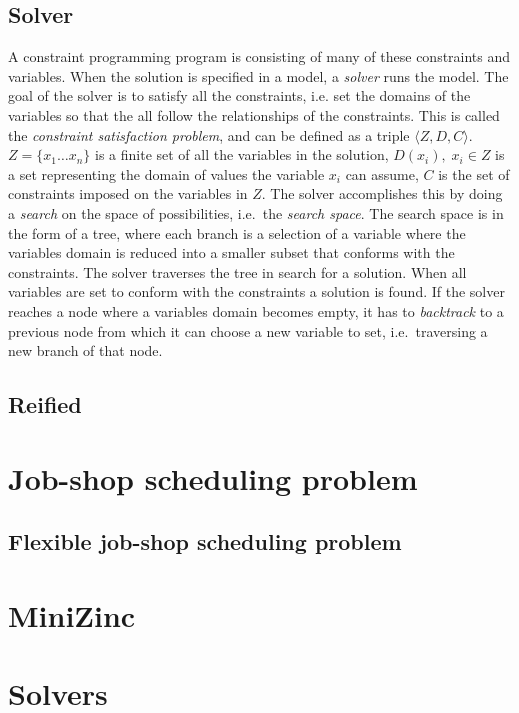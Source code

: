 \subsection{Solver}
A constraint programming program is consisting of many of these constraints and variables. When the solution is specified in a model, a \emph{solver} runs the model. The goal of the solver is to satisfy all the constraints, i.e. set the domains of the variables so that the all follow the relationships of the constraints. This is called the \emph{constraint satisfaction problem}, and can  be defined as a triple $\langle Z,D,C \rangle$. $Z=\{x_1 \ldots x_n\}$ is a finite set of all the variables in the solution, $D(x_i), \; x_i \in Z$ is a set representing the domain of values the variable $x_i$ can assume, $C$ is the set of constraints imposed on the variables in $Z$. The solver accomplishes this by doing a \emph{search} on the space of possibilities, i.e.\ the \emph{search space}. The search space is in the form of a tree, where each branch is a selection of a variable where the variables domain is reduced into a smaller subset that conforms with the constraints. The solver traverses the tree in search for a solution. When all variables are set to conform with the constraints a solution is found. If the solver reaches a node where a variables domain becomes empty, it has to \emph{backtrack} to a previous node from which it can choose a new variable to set, i.e.\ traversing a new branch of that node.

\cite{tsang_1993}
\cite{marriott_1998}
\cite{mz_manual}

\subsection{Reified}

\section{Job-shop scheduling problem}
\subsection{Flexible job-shop scheduling problem}

\section{MiniZinc}

\section{Solvers}
